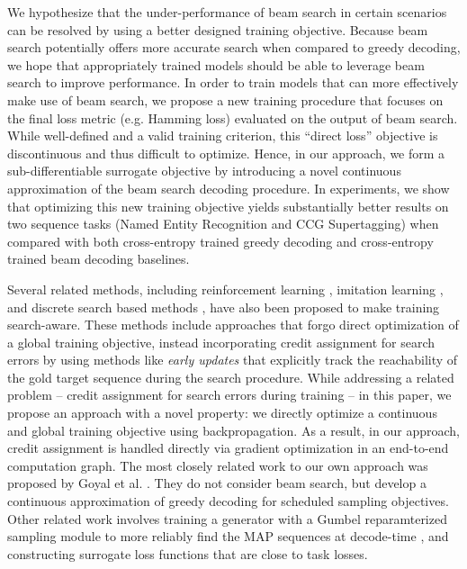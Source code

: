 \documentclass[letterpaper]{article} %
\begin{document}
We hypothesize that the under-performance of beam search in certain scenarios can be resolved by using a better designed training objective.
Because beam search potentially offers more accurate search when compared to greedy decoding, we hope that appropriately trained models should be able to leverage beam search to improve performance. In order to train models that can more effectively make use of beam search, we propose a new training procedure that focuses on the final loss metric (e.g. Hamming loss) evaluated on the output of beam search. While well-defined and a valid training criterion, this ``direct loss'' objective is discontinuous and thus difficult to optimize. Hence, in our approach, we form a sub-differentiable surrogate objective by introducing a novel continuous approximation of the beam search decoding procedure. In experiments, we show that optimizing this new training objective yields substantially better results on two sequence tasks (Named Entity Recognition and CCG Supertagging) when compared with both cross-entropy trained greedy decoding and cross-entropy trained beam decoding baselines. 

Several related methods, including  reinforcement learning \cite{ranzato2015sequence,bahdanau2016actor}, imitation learning \cite{daume2009search,ross2011reduction,bengioss}, and discrete search based methods \cite{wiseman2016sequence,andor2016globally,daume2005learning,gormley2015approximation}, have also been proposed to make training search-aware.
These methods include approaches that forgo direct optimization of a global training objective, instead incorporating credit assignment for search errors by using methods like \textit{early updates} \cite{collins2004incremental} that explicitly track the reachability of the gold target sequence during the search procedure.  While addressing a related problem -- credit assignment for search errors during training -- in this paper, we propose an approach with a novel property: we directly optimize a continuous and global training objective using backpropagation. As a result, in our approach, credit assignment is handled directly via gradient optimization in an end-to-end computation graph. The most closely related work to our own approach was proposed by Goyal et al. \cite{softgreedy}. They do not consider beam search, but develop a continuous approximation of greedy decoding for scheduled sampling objectives. Other related work involves training a generator with a Gumbel reparamterized sampling module to more reliably find the MAP sequences at decode-time \cite{gu2017neural}, and constructing surrogate loss functions \cite{bahdanau2016task} that are close to task losses.
\end{document}
